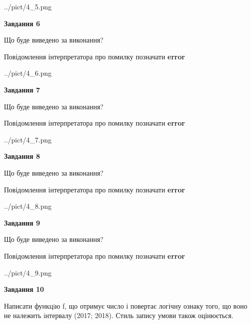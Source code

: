 \documentclass[12pt, ukrainian]{article}
\begin{document}
{\begin {large}
\begin{center}
	{../pict/4_5.png}
\end{center}
\newpage

{\begin {center}\textbf{Завдання 6}\end {center}}\par
Що буде виведено за виконання? \par
Повідомлення інтерпретатора про помилку позначати \textbf{error}

\begin{center}
	{../pict/4_6.png}
\end{center}
\newpage

{\begin {center}\textbf{Завдання 7}\end {center}}\par
Що буде виведено за виконання? \par
Повідомлення інтерпретатора про помилку позначати \textbf{error}

\begin{center}
	{../pict/4_7.png}
\end{center}
\newpage

{\begin {center}\textbf{Завдання 8}\end {center}}\par
Що буде виведено за виконання? \par
Повідомлення інтерпретатора про помилку позначати \textbf{error}

\begin{center}
	{../pict/4_8.png}
\end{center}
\newpage

{\begin {center}\textbf{Завдання 9}\end {center}}\par
Що буде виведено за виконання? \par
Повідомлення інтерпретатора про помилку позначати \textbf{error}

\begin{center}
	{../pict/4_9.png}
\end{center}
\newpage

{\begin {center}\textbf{Завдання 10}\end {center}}\par

Написати функцiю f, що отримує число і повертає логічну ознаку того, що воно не належить iнтервалу (2017; 2018). Стиль запису умови також оцінюється.\par
\newpage

\end {large}}
\end{document}
